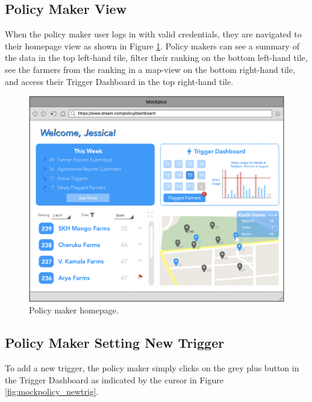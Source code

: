 \newpage
\subsection{Policy Maker View}
\noindent
When the policy maker user logs in with valid credentials, they are navigated to their homepage view as shown in Figure \ref{fig:mockpolicy_dash}. Policy makers can see a summary of the data in the top left-hand tile, filter their ranking on the bottom left-hand tile, see the farmers from the ranking in a map-view on the bottom right-hand tile, and access their Trigger Dashboard in the top right-hand tile. 

\begin{figure}[H]
\centering
\includegraphics[scale=0.37]{../images_diagrams/mock_ups/policydash100.png}
\caption{\label{fig:mockpolicy_dash}Policy maker homepage.}
\end{figure}

\subsection{Policy Maker Setting New Trigger}
\noindent
To add a new trigger, the policy maker simply clicks on the grey plus button in the Trigger Dashboard as indicated by the cursor in Figure \ref{fig:mockpolicy_newtrig}.

